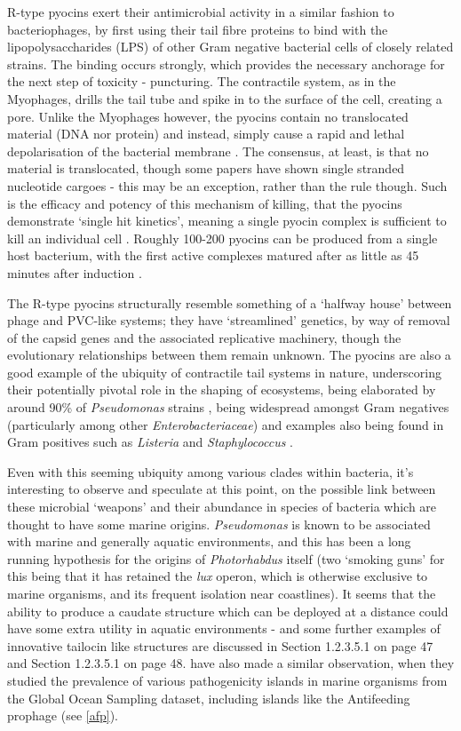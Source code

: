 R-type pyocins exert their antimicrobial activity in a similar fashion to bacteriophages, by first using their tail fibre proteins to bind with the lipopolysaccharides (LPS) of other Gram negative bacterial cells of closely related strains. The binding occurs strongly, which provides the necessary anchorage for the next step of toxicity - puncturing. The contractile system, as in the Myophages, drills the tail tube and spike in to the surface of the cell, creating a pore. Unlike the Myophages however, the pyocins contain no translocated material (DNA nor protein) and instead, simply cause a rapid and lethal depolarisation of the bacterial membrane \citep{Uratani1984}. The consensus, at least, is that no material is translocated, though some papers have shown single stranded nucleotide cargoes \citep{Lee1999} - this may be an exception, rather than the rule though. Such is the efficacy and potency of this mechanism of killing, that the pyocins demonstrate `single hit kinetics', meaning a single pyocin complex is sufficient to kill an individual cell \citep{OHKAWA1973}. Roughly 100-200 pyocins can be produced from a single host bacterium, with the first active complexes matured after as little as 45 minutes after induction \citep{Michel-Briand2002, Shinomiya1972, Scholl2008}.

The R-type pyocins structurally resemble something of a `halfway house' between phage and PVC-like systems; they have `streamlined' genetics, by way of removal of the capsid genes and the associated replicative machinery, though the evolutionary relationships between them remain unknown. The pyocins are also a good example of the ubiquity of contractile tail systems in nature, underscoring their potentially pivotal role in the shaping of ecosystems, being elaborated by around 90\% of \emph{Pseudomonas} strains \citep{Michel-Briand2002}, being widespread amongst Gram negatives (particularly among other \emph{Enterobacteriaceae}) \citep{Coetzee1968} and examples also being found in Gram positives such as \emph{Listeria} \citep{Zink1995} and \emph{Staphylococcus} \citep{Birmingham1981, Scholl2008}. 

Even with this seeming ubiquity among various clades within bacteria, it's interesting to observe and speculate at this point, on the possible link between these microbial `weapons' and their abundance in species of bacteria which are thought to have some marine origins. \emph{Pseudomonas} is known to be associated with marine and generally aquatic environments, and this has been a long running hypothesis for the origins of \emph{Photorhabdus} itself (two `smoking guns' for this being that it has retained the \emph{lux} operon, which is otherwise exclusive to marine organisms, and its frequent isolation near coastlines). It seems that the ability to produce a caudate structure which can be deployed at a distance could have some extra utility in aquatic environments - and some further examples of innovative tailocin like structures are discussed in Section 1.2.3.5.1 on page 47 and Section 1.2.3.5.1 on page 48. \cite{Persson2009} have also made a similar observation, when they studied the prevalence of various pathogenicity islands in marine organisms from the Global Ocean Sampling dataset, including islands like the Antifeeding prophage (see \vref{afp}).


